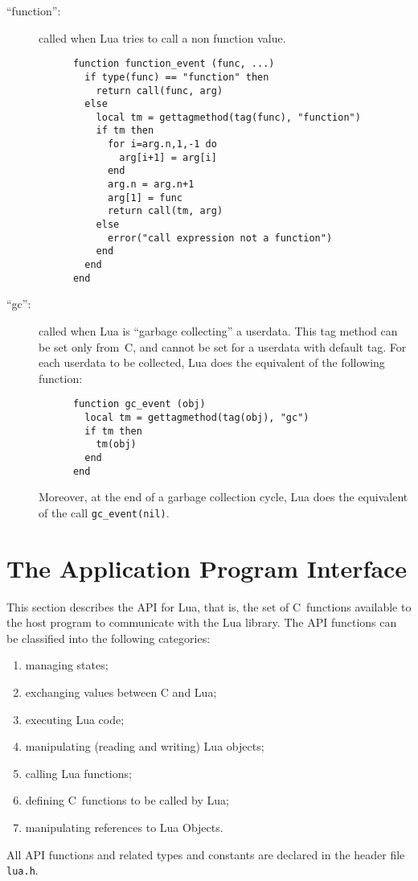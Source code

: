 \documentclass[11pt]{article}
\begin{document}
\begin{description}
\item[``function'':]
called when Lua tries to call a non function value.
\begin{verbatim}
      function function_event (func, ...)
        if type(func) == "function" then
          return call(func, arg)
        else
          local tm = gettagmethod(tag(func), "function")
          if tm then
            for i=arg.n,1,-1 do
              arg[i+1] = arg[i]
            end
            arg.n = arg.n+1
            arg[1] = func
            return call(tm, arg)
          else
            error("call expression not a function")
          end
        end
      end
\end{verbatim}

\item[``gc'':]
called when Lua is ``garbage collecting'' a userdata.
This tag method can be set only from~C,
and cannot be set for a userdata with default tag.
For each userdata to be collected,
Lua does the equivalent of the following function:
\begin{verbatim}
      function gc_event (obj)
        local tm = gettagmethod(tag(obj), "gc")
        if tm then
          tm(obj)
        end
      end
\end{verbatim}
Moreover, at the end of a garbage collection cycle,
Lua does the equivalent of the call \verb|gc_event(nil)|.

\end{description}




\section{The Application Program Interface}

This section describes the API for Lua, that is,
the set of C~functions available to the host program to communicate
with the Lua library.
The API functions can be classified into the following categories:
\begin{enumerate}
\item managing states;
\item exchanging values between C and Lua;
\item executing Lua code;
\item manipulating (reading and writing) Lua objects;
\item calling Lua functions;
\item defining C~functions to be called by Lua;
\item manipulating references to Lua Objects.
\end{enumerate}
All API functions and related types and constants
are declared in the header file \verb|lua.h|.
\end{document}
